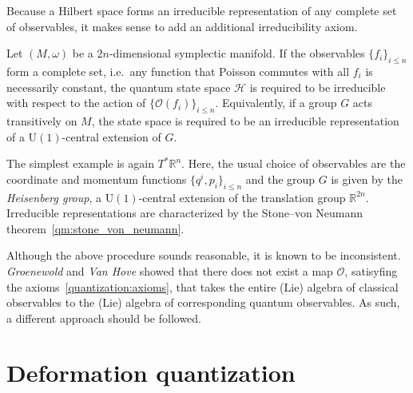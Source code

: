     Because a Hilbert space forms an irreducible representation of any complete set of observables, it makes sense to add an additional irreducibility axiom.
    \begin{axiom}
        Let $(M,\omega)$ be a $2n$-dimensional symplectic manifold. If the observables $\{f_i\}_{i\leq n}$ form a complete set, i.e.~any function that Poisson commutes with all $f_i$ is necessarily constant, the quantum state space $\mathcal{H}$ is required to be irreducible with respect to the action of $\{\mathcal{O}(f_i)\}_{i\leq n}$. Equivalently, if a group $G$ acts transitively on $M$, the state space is required to be an irreducible representation of a $\mathrm{U}(1)$-central extension of $G$.
    \end{axiom}

    The simplest example is again $T^*\mathbb{R}^n$. Here, the usual choice of observables are the coordinate and momentum functions $\{q^i,p_i\}_{i\leq n}$ and the group $G$ is given by the \textit{Heisenberg group}, a $\mathrm{U}(1)$-central extension of the translation group $\mathbb{R}^{2n}$. Irreducible representations are characterized by the Stone--von Neumann theorem~\ref{qm:stone_von_neumann}.

    Although the above procedure sounds reasonable, it is known to be inconsistent. \textit{Groenewold} and \textit{Van Hove} showed that there does not exist a map $\mathcal{O}$, satisyfing the axioms~\ref{quantization:axioms}, that takes the entire (Lie) algebra of classical observables to the (Lie) algebra of corresponding quantum observables. As such, a different approach should be followed.

\section{Deformation quantization}


